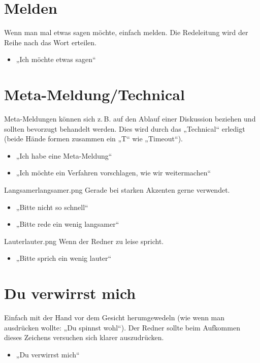 \section{Melden}
Wenn man mal etwas sagen möchte, einfach melden. Die Redeleitung wird der Reihe
nach das Wort erteilen.
\begin{itemize}
	\item „Ich möchte etwas sagen“
\end{itemize}

\section{Meta-Meldung/Technical}
Meta-Meldungen können sich z.\,B. auf den Ablauf einer Diskussion beziehen und
sollten bevorzugt behandelt werden. Dies wird durch das „Technical“ erledigt
(beide Hände formen zusammen ein „T“ wie „Timeout“).
\begin{itemize}
	\item „Ich habe eine Meta-Meldung“
	\item „Ich möchte ein Verfahren vorschlagen, wie wir weitermachen“
\end{itemize}

\begin{handzeichen}{Langsamer}{langsamer.png}
Gerade bei starken Akzenten gerne verwendet.
\begin{itemize}
	\item „Bitte nicht so schnell“
	\item „Bitte rede ein wenig langsamer“
\end{itemize}
\end{handzeichen}

\begin{handzeichen}{Lauter}{lauter.png}
Wenn der Redner zu leise spricht.
\begin{itemize}
	\item „Bitte sprich ein wenig lauter“
\end{itemize}
\end{handzeichen}

\section{Du verwirrst mich}
Einfach mit der Hand vor dem Gesicht herumgewedeln (wie wenn man ausdrücken
wollte: „Du spinnst wohl“). Der Redner sollte beim Aufkommen dieses Zeichens
versuchen sich klarer auszudrücken.
\begin{itemize}
	\item „Du verwirrst mich“
\end{itemize}

